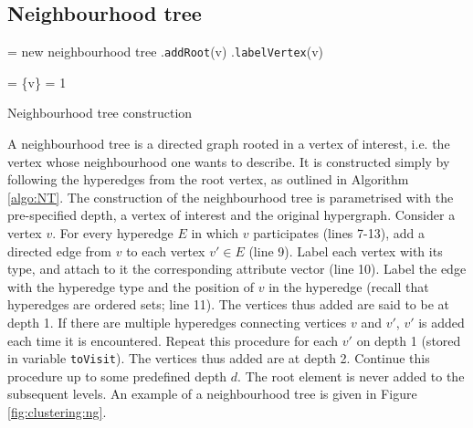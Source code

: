 \subsection{Neighbourhood tree}
\label{sec:NT}



\begin{algorithm}[t]
\SetAlgoLined
{}
 \NT = new neighbourhood tree\;
 \NT.\texttt{addRoot}(v)\;
 \NT.\texttt{labelVertex}(v) 

 \Tovisit = \{v\} 
 \D = 1 

 \caption{Neighbourhood tree construction}
 \label{algo:NT}
\end{algorithm}


A neighbourhood tree is a directed graph rooted in a vertex of interest, i.e. the vertex whose neighbourhood one wants to describe.
It is constructed simply by following the hyperedges from the root vertex, as outlined in Algorithm \ref{algo:NT}.
The construction of the neighbourhood tree is parametrised with the pre-specified depth, a vertex of interest and the original hypergraph.
Consider a vertex $v$.
For every hyperedge $E$ in which $v$ participates (lines 7-13), add a directed edge from $v$ to each vertex $v' \in E$ (line 9).
Label each vertex with its type, and attach to it the corresponding attribute vector (line 10).
Label the edge with the hyperedge type and the position of $v$ in the hyperedge (recall that hyperedges are ordered sets; line 11).
The vertices thus added are said to be at depth 1.
If there are multiple hyperedges connecting vertices $v$ and $v'$, $v'$ is added each time it is encountered.
Repeat this procedure for each $v'$ on depth 1 (stored in variable \texttt{toVisit}).
The vertices thus added are at depth 2.
Continue this procedure up to some predefined depth $d$.
The root element is never added to the subsequent levels.
An example of a neighbourhood tree is given in Figure \ref{fig:clustering:ng}.


